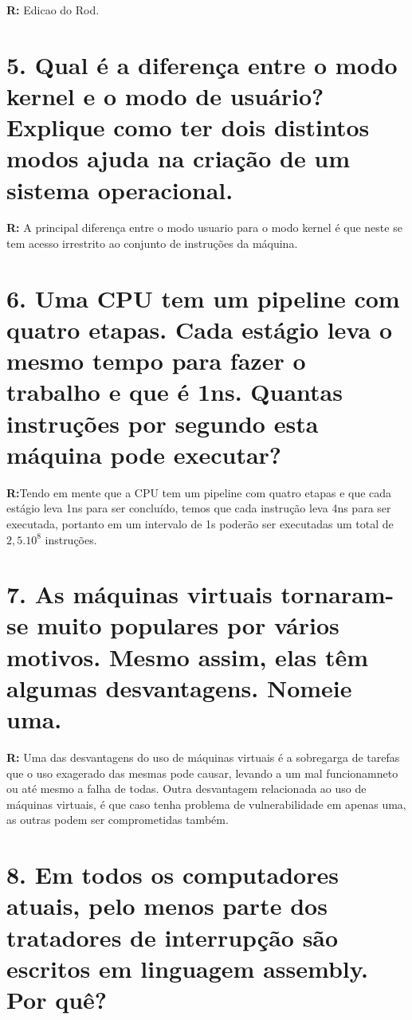 \documentclass{article}
\begin{document}
\medskip
\noindent
\textbf{R:} Edicao do Rod.

\section*{5. \large Qual é a diferença entre o modo kernel e o modo de usuário? Explique como ter dois distintos modos ajuda na criação de um sistema operacional.}

\medskip
\noindent
\textbf{R:} A principal diferença entre o modo usuario para o modo kernel é que neste se tem acesso irrestrito ao conjunto de instruções da máquina.

\section*{6. \large Uma CPU tem um pipeline com quatro etapas. Cada estágio leva o mesmo tempo para fazer o trabalho e que é 1ns. Quantas instruções por segundo esta máquina pode executar?}

\medskip
\noindent
\textbf{R:}Tendo em mente que a CPU tem um pipeline com quatro etapas e que cada estágio leva 1ns para ser concluído, temos que cada instrução leva 4ns para ser executada, portanto em um intervalo de 1s poderão ser executadas um total de $2,5.10^8$ instruções.

\section*{7. \large As máquinas virtuais tornaram-se muito populares por vários motivos. Mesmo assim, elas têm algumas desvantagens. Nomeie uma.}

\medskip
\noindent
\textbf{R:} Uma das desvantagens do uso de máquinas virtuais é a sobregarga de tarefas que o uso exagerado das mesmas pode causar, levando a um mal funcionamneto ou até mesmo a falha de todas. Outra desvantagem relacionada ao uso de máquinas virtuais, é que caso tenha problema de vulnerabilidade em apenas uma, as outras podem ser comprometidas também.

\section*{8. \large Em todos os computadores atuais, pelo menos parte dos tratadores de interrupção são escritos em linguagem assembly. Por quê?}
\end{document}
